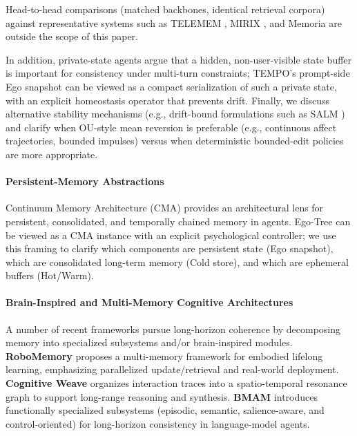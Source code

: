 \documentclass[11pt]{article}
\begin{document}
Head-to-head comparisons (matched backbones, identical retrieval corpora) against representative systems such as TELEMEM \cite{telemem2025}, MIRIX \cite{mirix2025}, and Memoria \cite{memoria2025} are outside the scope of this paper.

In addition, private-state agents argue that a hidden, non-user-visible state buffer is important for consistency under multi-turn constraints; TEMPO's prompt-side Ego snapshot can be viewed as a compact serialization of such a private state, with an explicit homeostasis operator that prevents drift.
Finally, we discuss alternative stability mechanisms (e.g., drift-bound formulations such as SALM \cite{salm2024}) and clarify when OU-style mean reversion is preferable (e.g., continuous affect trajectories, bounded impulses) versus when deterministic bounded-edit policies are more appropriate.

\paragraph{Persistent-Memory Abstractions}
Continuum Memory Architecture (CMA) \cite{cma2024} provides an architectural lens for persistent, consolidated, and temporally chained memory in agents. Ego-Tree can be viewed as a CMA instance with an explicit psychological controller; we use this framing to clarify which components are persistent state (Ego snapshot), which are consolidated long-term memory (Cold store), and which are ephemeral buffers (Hot/Warm).

\paragraph{Brain-Inspired and Multi-Memory Cognitive Architectures}
A number of recent frameworks pursue long-horizon coherence by decomposing memory into specialized subsystems and/or brain-inspired modules. \textbf{RoboMemory} \cite{lei2025robomemory} proposes a multi-memory framework for embodied lifelong learning, emphasizing parallelized update/retrieval and real-world deployment. \textbf{Cognitive Weave} \cite{vishwakarma2025cognitiveweave} organizes interaction traces into a spatio-temporal resonance graph to support long-range reasoning and synthesis. \textbf{BMAM} \cite{li2026bmam} introduces functionally specialized subsystems (episodic, semantic, salience-aware, and control-oriented) for long-horizon consistency in language-model agents.
\end{document}

